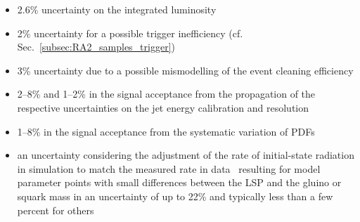 \begin{itemize} 
\item 2.6\% uncertainty on the integrated luminosity~\cite{CMS-PAS-LUM-13-001}
\item 2\% uncertainty for a possible trigger inefficiency (cf. Sec.~\ref{subsec:RA2_samples_trigger})
\item 3\% uncertainty due to a possible mismodelling of the event cleaning efficiency
\item 2--8\% and 1--2\% in the signal acceptance from the propagation of the respective uncertainties on the jet energy calibration and resolution 
\item 1--8\% in the signal acceptance from the systematic variation of PDFs~\cite{Botje:2011sn} 
\item an uncertainty considering the adjustment of the rate of initial-state radiation in simulation to match the measured rate in data~\cite{isrfsr} resulting for model parameter points with small differences between the LSP and the gluino or squark mass in an uncertainty of up to 22\% and typically less than a few percent for others  
\end{itemize}

